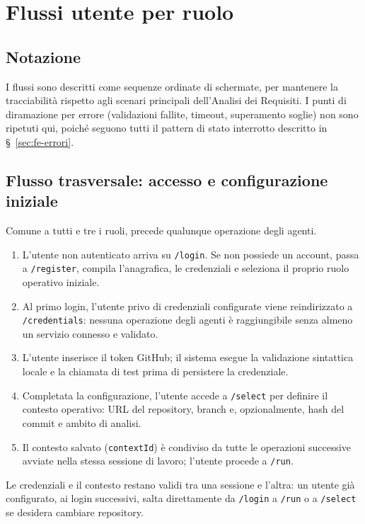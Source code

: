 \documentclass[11pt,a4paper]{article}
\begin{document}
\section{Flussi utente per ruolo}

\subsection{Notazione}

I flussi sono descritti come sequenze ordinate di schermate, per mantenere la tracciabilità rispetto agli scenari principali dell'Analisi dei Requisiti. I punti di diramazione per errore (validazioni fallite, timeout, superamento soglie) non sono ripetuti qui, poiché seguono tutti il pattern di stato interrotto descritto in \S~\ref{sec:fe-errori}.

\subsection{Flusso trasversale: accesso e configurazione iniziale}

Comune a tutti e tre i ruoli, precede qualunque operazione degli agenti.

\begin{enumerate}
    \item L'utente non autenticato arriva su \texttt{/login}. Se non possiede un account, passa a \texttt{/register}, compila l'anagrafica, le credenziali e seleziona il proprio ruolo operativo iniziale.
    \item Al primo login, l'utente privo di credenziali configurate viene reindirizzato a \texttt{/credentials}: nessuna operazione degli agenti è raggiungibile senza almeno un servizio connesso e validato.
    \item L'utente inserisce il token GitHub; il sistema esegue la validazione sintattica locale e la chiamata di test prima di persistere la credenziale.
    \item Completata la configurazione, l'utente accede a \texttt{/select} per definire il contesto operativo: URL del repository, branch e, opzionalmente, hash del commit e ambito di analisi.
    \item Il contesto salvato (\texttt{contextId}) è condiviso da tutte le operazioni successive avviate nella stessa sessione di lavoro; l'utente procede a \texttt{/run}.
\end{enumerate}

Le credenziali e il contesto restano validi tra una sessione e l'altra: un utente già configurato, ai login successivi, salta direttamente da \texttt{/login} a \texttt{/run} o a \texttt{/select} se desidera cambiare repository.
\end{document}
